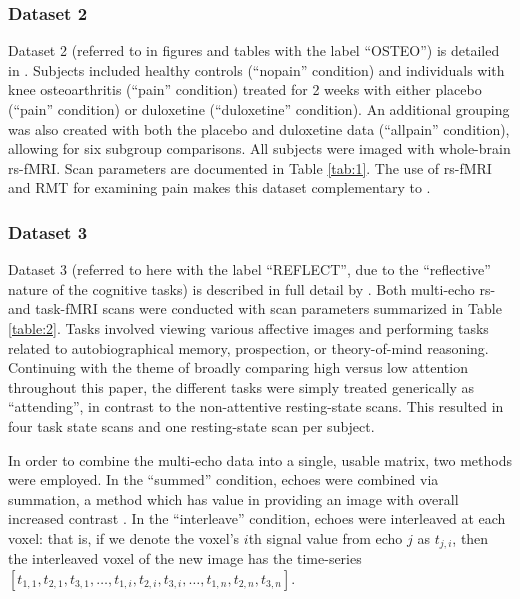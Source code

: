 \documentclass[10pt]{article}
\begin{document}
\subsubsection{Dataset 2}
Dataset 2 (referred to in figures and tables with the label ``OSTEO'') is detailed in
\cite{tetreaultBrainConnectivityPredicts2016}. Subjects included healthy controls (``nopain''
condition) and individuals with knee osteoarthritis (``pain'' condition) treated for 2 weeks with
either placebo (``pain'' condition) or duloxetine (``duloxetine'' condition). An additional grouping was
also created with both the placebo and duloxetine data (``allpain'' condition), allowing for six
subgroup comparisons. All subjects were imaged with whole-brain rs-fMRI. Scan parameters are
documented in Table \ref{tab:1}. The use of rs-fMRI and RMT for examining pain makes this dataset
complementary to \cite{matharooSpontaneousBackpainAlters2020}.

\subsubsection{Dataset 3}
Dataset 3  (referred to here with the label ``REFLECT'', due to the ``reflective” nature of the
cognitive tasks) is described in full detail by \cite{dupreMultiechoFMRIReplication2016}. Both
multi-echo rs- and task-fMRI scans were conducted with scan parameters summarized in Table \ref{table:2}. Tasks
involved viewing various affective images \citep[see][for details]{sprengPatternsBrainActivity2010}
and performing tasks related to autobiographical memory, prospection, or theory-of-mind reasoning.
Continuing with the theme of broadly comparing high versus low attention throughout this paper, the
different tasks were simply treated generically as ``attending'', in contrast to the non-attentive
resting-state scans. This resulted in four task state scans and one resting-state scan per subject.

In order to combine the multi-echo data into a single, usable matrix, two methods were employed. In
the ``summed'' condition, echoes were combined via summation, a method which has value in providing an
image with overall increased contrast \citep{kunduMultiechoFMRIReview2017}. In the ``interleave''
condition, echoes were interleaved at each voxel: that is, if we denote the voxel's \(i\)th signal value
from echo \(j\) as \(t_{j,i}\), then the interleaved voxel of the new image has the time-series \([t_{1,1},
t_{2,1}, t_{3,1}, \dots, t_{1,i}, t_{2,i}, t_{3,i}, \dots, t_{1,n}, t_{2,n}, t_{3,n}]\).
\end{document}
